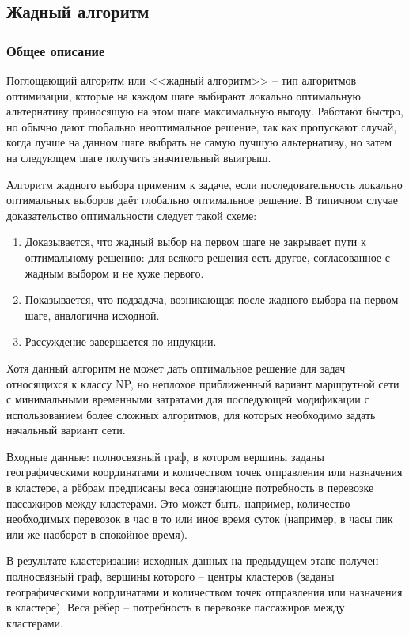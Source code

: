 \clearpage

\subsection{Жадный алгоритм}\label{sec:greedy-alg}
\subsubsection{Общее описание}
Поглощающий алгоритм или <<жадный алгоритм>> -- тип алгоритмов оптимизации, которые на каждом 
шаге выбирают локально оптимальную альтернативу приносящую на этом шаге максимальную выгоду. Работают быстро, 
но обычно дают глобально неоптимальное решение, так как пропускают случай, когда лучше на данном шаге выбрать 
не самую лучшую альтернативу, но затем на следующем шаге получить значительный выигрыш.

Алгоритм жадного выбора применим к задаче, если последовательность локально оптимальных выборов даёт глобально 
оптимальное решение. В типичном случае доказательство оптимальности следует такой схеме:
\begin{enumerate}
    \item Доказывается, что жадный выбор на первом шаге не закрывает пути к оптимальному решению: для всякого решения 
        есть другое, согласованное с жадным выбором и не хуже первого.
    \item Показывается, что подзадача, возникающая после жадного выбора на первом шаге, аналогична исходной.
    \item Рассуждение завершается по индукции.
\end{enumerate}

Хотя данный алгоритм не может дать оптимальное решение для задач относящихся к классу NP, но неплохое 
приближенный вариант маршрутной сети с минимальными временными затратами для последующей модификации с 
использованием более сложных алгоритмов, для которых необходимо задать начальный вариант сети.

Входные данные: полносвязный граф, в котором вершины заданы географическими координатами и количеством 
точек отправления или назначения в кластере, а рёбрам предписаны веса означающие потребность в перевозке 
пассажиров между кластерами. Это может быть, например, количество необходимых перевозок в час в то или иное 
время суток (например, в часы пик или же наоборот в спокойное время).

В результате кластеризации исходных данных на предыдущем этапе получен полносвязный граф, вершины 
которого -- центры кластеров (заданы географическими координатами и количеством точек отправления или 
назначения в кластере). Веса рёбер -- потребность в перевозке пассажиров между кластерами. 

